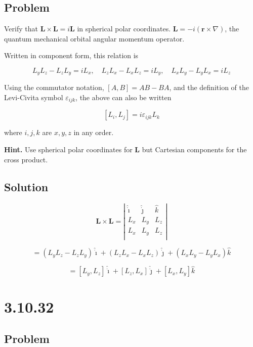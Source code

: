 \documentclass[12pt]{article}
\begin{document}
\subsection{Problem}

Verify that \(\textbf{L} \times \textbf{L} = i \textbf{L}\) in spherical polar coordinates.
\(\textbf{L} = -i \left(\textbf{r} \times \nabla\right)\), the quantum mechanical orbital angular
momentum operator.

Written in component form, this relation is

\[
    L_y L_z - L_z L_y = i L_x , \quad L_z L_x - L_x L_z = i L_y ,\quad L_x L_y - L_y L_x = i L_z
\]

Using the commutator notation, \([A, B] = AB - BA\), and the definition of the Levi-Civita symbol
\(\varepsilon_{ijk}\), the above can also be written

\[
    [L_i, L_j] = i \varepsilon_{ijk} L_k
\]

where \(i , j , k\) are \(x, y, z\) in any order.

\textbf{Hint.} Use spherical polar coordinates for \textbf{L}
but Cartesian components for the cross product.

\subsection{Solution}

\[
    \textbf{L} \times \textbf{L} = \left\lvert \begin{array}{ccc}
        \hat{\dot{\imath}} & \hat{\dot{\jmath}} & \hat{k} \\
        L_x                & L_y                & L_z     \\
        L_x                & L_y                & L_z     \\
    \end{array} \right\rvert
\]

\[
    = \left(L_y L_z - L_z L_y\right) \hat{\dot{\imath}}
    + \left(L_z L_x - L_x L_z\right) \hat{\dot{\jmath}}
    + \left(L_x L_y - L_y L_x\right) \hat{k}
\]

\[
    = [L_y, L_z] \hat{\dot{\imath}} + [L_z, L_x] \hat{\dot{\jmath}} + [L_x, L_y] \hat{k}
\] %

\section{3.10.32}

\subsection{Problem}
\end{document}
